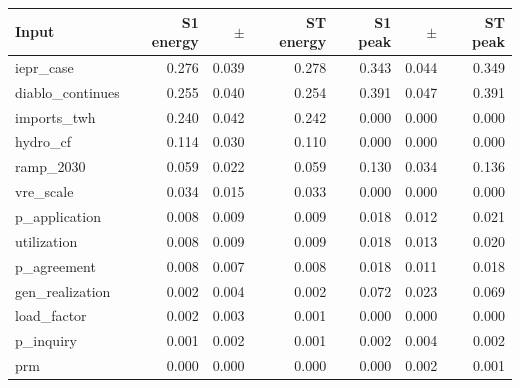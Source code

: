\begin{tabular}{lrrrrrr}
\toprule
Input & S1 energy & $\pm$ & ST energy & S1 peak & $\pm$ & ST peak \\
\midrule
iepr\_case & 0.276 & 0.039 & 0.278 & 0.343 & 0.044 & 0.349 \\
diablo\_continues & 0.255 & 0.040 & 0.254 & 0.391 & 0.047 & 0.391 \\
imports\_twh & 0.240 & 0.042 & 0.242 & 0.000 & 0.000 & 0.000 \\
hydro\_cf & 0.114 & 0.030 & 0.110 & 0.000 & 0.000 & 0.000 \\
ramp\_2030 & 0.059 & 0.022 & 0.059 & 0.130 & 0.034 & 0.136 \\
vre\_scale & 0.034 & 0.015 & 0.033 & 0.000 & 0.000 & 0.000 \\
p\_application & 0.008 & 0.009 & 0.009 & 0.018 & 0.012 & 0.021 \\
utilization & 0.008 & 0.009 & 0.009 & 0.018 & 0.013 & 0.020 \\
p\_agreement & 0.008 & 0.007 & 0.008 & 0.018 & 0.011 & 0.018 \\
gen\_realization & 0.002 & 0.004 & 0.002 & 0.072 & 0.023 & 0.069 \\
load\_factor & 0.002 & 0.003 & 0.001 & 0.000 & 0.000 & 0.000 \\
p\_inquiry & 0.001 & 0.002 & 0.001 & 0.002 & 0.004 & 0.002 \\
prm & 0.000 & 0.000 & 0.000 & 0.000 & 0.002 & 0.001 \\
\bottomrule
\end{tabular}